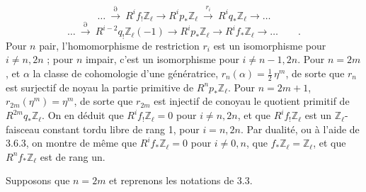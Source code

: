 \begin{equation}\tag{3.6.2}
\ldots \ \stackrel{\partial}{\longrightarrow}\ R^{i}f_{!}\mathbb{Z}_{\ell} \longrightarrow R^{i}p_{*}\mathbb{Z}_{\ell} \ \stackrel{r_{i}}{\longrightarrow}\ R^{i}q_{*}\mathbb{Z}_{\ell} \longrightarrow \ldots
\end{equation}
\begin{equation}\tag{3.6.3}
\ldots \ \stackrel{\partial}{\longrightarrow}\ R^{i-2}q_{!}\mathbb{Z}_{\ell}(-1) \longrightarrow R^{i}p_{*}\mathbb{Z}_{\ell} \longrightarrow R^{i}f_{*}\mathbb{Z}_{\ell} \longrightarrow \ldots \qquad .
\end{equation}
Pour $n$ pair, l'homomorphisme de restriction $r_{i}$ est un isomorphisme pour $i \neq n,2n$ ; pour $n$ impair, c'est un isomorphisme pour $i \neq n-1,2n$. Pour $n = 2m$, et $\alpha$ la classe de cohomologie d'une génératrice, $r_{n}(\alpha) = \frac{1}{2}\,\eta^{m}$, de sorte que $r_{n}$ est surjectif de noyau la partie primitive de $R^{n}p_{*}\mathbb{Z}_{\ell}$. Pour $n = 2m + 1$, $r_{2m}(\eta^{m}) = \eta^{m}$, de sorte que $r_{2m}$ est injectif de conoyau le quotient primitif de $R^{2m}q_{*}\mathbb{Z}_{\ell}$. On en déduit que $R^{i}f_{!}\mathbb{Z}_{\ell} = 0$ pour $i \neq n,2n$, et que $R^{i}f_{!}\mathbb{Z}_{\ell}$ est un $\mathbb{Z}_{\ell}$-faisceau constant tordu libre de rang 1, pour $i = n,2n$. Par dualité, ou à l'aide de 3.6.3, on montre de même que $R^{i}f_{*}\mathbb{Z}_{\ell} = 0$ pour $i \neq 0,n$, que $f_{*}\mathbb{Z}_{\ell} = \mathbb{Z}_{\ell}$, et que $R^{n}f_{*}\mathbb{Z}_{\ell}$ est de rang un.

Supposons que $n = 2m$ et reprenons les notations de 3.3.



